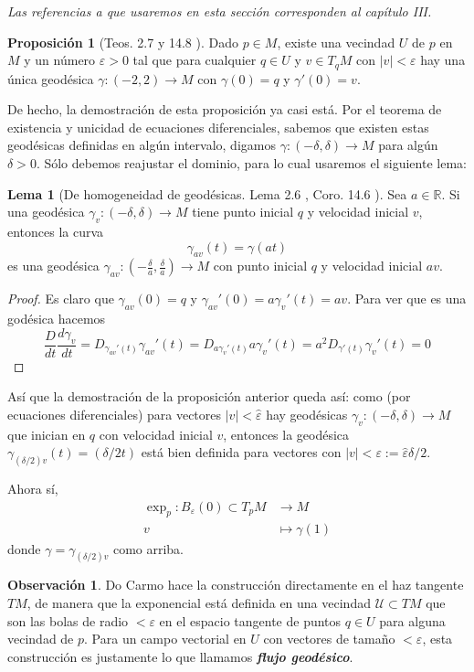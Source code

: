 \documentclass[spanish]{book}
\theoremstyle{definition}
\newtheorem*{prop}{Proposición}
\newtheorem*{lema}{Lema}
\newtheorem*{obs}{Observación}
\newcommand{\R}{\mathbb{R}}
\begin{document}
	\textit{Las referencias a \cite{DoCarmo} que usaremos en esta sección corresponden al capítulo III.}
	
	\begin{prop}[Teos. 2.7 \cite{DoCarmo} y 14.8 \cite{Loring-dif}]
		Dado $p\in M$, existe una vecindad $U$ de $p$ en $M$ y un número $\varepsilon>0$ tal que para cualquier $q\in U$ y $v\in T_qM$ con $|v|<\varepsilon$ hay una única geodésica $\gamma:(-2,2)\to M$ con $\gamma(0)=q$ y $\gamma'(0)=v$.
	\end{prop}
	De hecho, la demostración de esta proposición ya casi está. Por el teorema de existencia y unicidad de ecuaciones diferenciales, sabemos que existen estas geodésicas definidas en algún intervalo, digamos $\gamma:(-\delta,\delta)\to M$ para algún $\delta>0$. Sólo debemos reajustar el dominio, para lo cual usaremos el siguiente lema:
	
	\begin{lema}[De homogeneidad de geodésicas. Lema 2.6 \cite{DoCarmo}, Coro. 14.6 \cite{Loring-dif}]
		Sea $a\in\R$. Si una geodésica $\gamma_v:(-\delta,\delta)\to M$ tiene punto inicial $q$ y velocidad inicial $v$, entonces la curva
		\[\gamma_{av}(t)=\gamma(at)\]
		es una geodésica $\gamma_{av}:(-\frac{\delta}{a},\frac{\delta}{a})\to M$ con punto inicial $q$ y velocidad inicial $av$.
	\end{lema}
	\begin{proof}
		Es claro que $\gamma_{av}(0)=q$ y $\gamma_{av}'(0)=a\gamma_v'(t)=av$. Para ver que es una godésica hacemos
		\[\frac{D}{dt}\frac{d\gamma_v}{dt}=D_{{\gamma_{av}'}(t)}\gamma_{av}'(t)=D_{a\gamma_v'(t)}a\gamma_v'(t)=a^2D_{\gamma'(t)}\gamma_v'(t)=0\]
	\end{proof}
	
	Así que la demostración de la proposición anterior queda así: como (por ecuaciones diferenciales) para vectores $|v|<\hat{\varepsilon}$ hay geodésicas $\gamma_v:(-\delta,\delta)\to M$ que inician en $q$ con velocidad inicial $v$, entonces la geodésica $\gamma_{(\delta/2)v}(t)=(\delta/2t)$ está bien definida para vectores con $|v|<\varepsilon:=\hat{\varepsilon}\delta/2$.
	
	Ahora sí,
	\begin{align*}
		\exp_p:B_{\varepsilon}(0)\subset T_pM&\to M\\
		v&\mapsto \gamma(1)
	\end{align*}
	donde $\gamma=\gamma_{(\delta/2)v}$ como arriba.
	\begin{obs}
		Do Carmo hace la construcción directamente en el haz tangente $TM$, de manera que la exponencial está definida en una vecindad $\mathcal{U}\subset TM$ que son las bolas de radio $<\varepsilon$ en el espacio tangente de puntos $q\in U$ para alguna vecindad de $p$. Para un campo vectorial en $U$ con vectores de tamaño $<\varepsilon$, esta construcción es justamente lo que llamamos \textbf{\textit{flujo geodésico}}.
	\end{obs}
	
\end{document}
